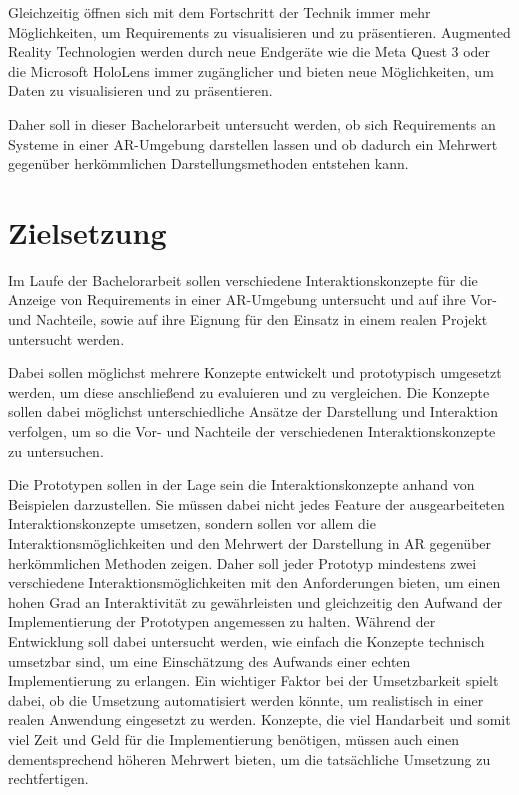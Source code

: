 Gleichzeitig öffnen sich mit dem Fortschritt der Technik immer mehr Möglichkeiten, um Requirements zu visualisieren und zu präsentieren.
Augmented Reality Technologien werden durch neue Endgeräte wie die Meta Quest 3 oder die Microsoft HoloLens immer zugänglicher und bieten neue Möglichkeiten, um Daten zu visualisieren und zu präsentieren.

Daher soll in dieser Bachelorarbeit untersucht werden, ob sich Requirements an Systeme in einer AR-Umgebung darstellen lassen und ob dadurch ein Mehrwert gegenüber herkömmlichen Darstellungsmethoden entstehen kann.


\section{Zielsetzung}

Im Laufe der Bachelorarbeit sollen verschiedene Interaktionskonzepte für die Anzeige von Requirements in einer AR-Umgebung untersucht und auf ihre Vor- und Nachteile, sowie auf ihre Eignung für den Einsatz in einem realen Projekt untersucht werden.

Dabei sollen möglichst mehrere Konzepte entwickelt und prototypisch umgesetzt werden, um diese anschließend zu evaluieren und zu vergleichen.
Die Konzepte sollen dabei möglichst unterschiedliche Ansätze der Darstellung und Interaktion verfolgen, um so die Vor- und Nachteile der verschiedenen Interaktionskonzepte zu untersuchen.

Die Prototypen sollen in der Lage sein die Interaktionskonzepte anhand von Beispielen darzustellen.
Sie müssen dabei nicht jedes Feature der ausgearbeiteten Interaktionskonzepte umsetzen, sondern sollen vor allem die Interaktionsmöglichkeiten und den Mehrwert der Darstellung in AR gegenüber herkömmlichen Methoden zeigen.
Daher soll jeder Prototyp mindestens zwei verschiedene Interaktionsmöglichkeiten mit den Anforderungen bieten, um einen hohen Grad an Interaktivität zu gewährleisten und gleichzeitig den Aufwand der Implementierung der Prototypen angemessen zu halten.
Während der Entwicklung soll dabei untersucht werden, wie einfach die Konzepte technisch umsetzbar sind, um eine Einschätzung des Aufwands einer echten Implementierung zu erlangen.
Ein wichtiger Faktor bei der Umsetzbarkeit spielt dabei, ob die Umsetzung automatisiert werden könnte, um realistisch in einer realen Anwendung eingesetzt zu werden.
Konzepte, die viel Handarbeit und somit viel Zeit und Geld für die Implementierung benötigen, müssen auch einen dementsprechend höheren Mehrwert bieten, um die tatsächliche Umsetzung zu rechtfertigen. 

